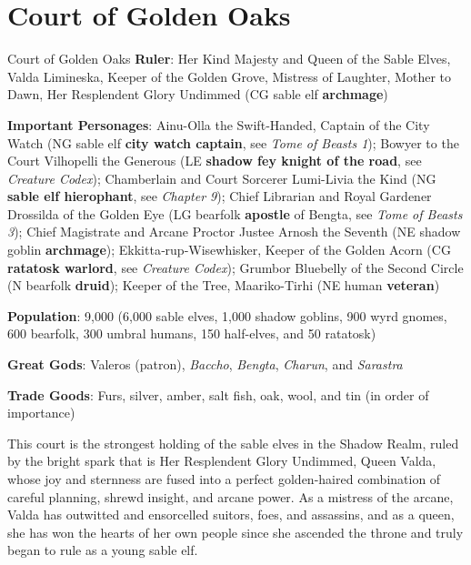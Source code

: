 \documentclass[10pt,a4paper,twoside,bg=print,twocolumn,openany,nodeprecatedcode]{dndbook}
\begin{document}
\section{Court of Golden Oaks}
\begin{DndSidebar}[float=!b]{Court of Golden Oaks}
\textbf{Ruler}: Her Kind Majesty and Queen of the Sable Elves, Valda Limineska, Keeper of the Golden Grove, Mistress of Laughter, Mother to Dawn, Her Resplendent Glory Undimmed (CG sable elf \textbf{archmage})



\textbf{Important Personages}: Ainu-Olla the Swift‑Handed, Captain of the City Watch (NG sable elf \textbf{city watch captain}, see \textit{Tome of Beasts 1}); Bowyer to the Court Vilhopelli the Generous (LE \textbf{shadow fey knight of the road}, see \textit{Creature Codex}); Chamberlain and Court Sorcerer Lumi-Livia the Kind (NG \textbf{sable elf hierophant}, see \textit{Chapter 9}); Chief Librarian and Royal Gardener Drossilda of the Golden Eye (LG bearfolk \textbf{apostle} of Bengta, see \textit{Tome of Beasts 3}); Chief Magistrate and Arcane Proctor Justee Arnosh the Seventh (NE shadow goblin \textbf{archmage}); Ekkitta‑rup‑Wisewhisker, Keeper of the Golden Acorn (CG \textbf{ratatosk warlord}, see \textit{Creature Codex}); Grumbor Bluebelly of the Second Circle (N bearfolk \textbf{druid}); Keeper of the Tree, Maariko-Tirhi (NE human \textbf{veteran})



\textbf{Population}: 9,000 (6,000 sable elves, 1,000 shadow goblins, 900 wyrd gnomes, 600 bearfolk, 300 umbral humans, 150 half-elves, and 50 ratatosk)



\textbf{Great Gods}: Valeros (patron), \textit{Baccho}, \textit{Bengta}, \textit{Charun}, and \textit{Sarastra}



\textbf{Trade Goods}: Furs, silver, amber, salt fish, oak, wool, and tin (in order of importance)





\end{DndSidebar}

This court is the strongest holding of the sable elves in the Shadow Realm, ruled by the bright spark that is Her Resplendent Glory Undimmed, Queen Valda, whose joy and sternness are fused into a perfect golden-haired combination of careful planning, shrewd insight, and arcane power. As a mistress of the arcane, Valda has outwitted and ensorcelled suitors, foes, and assassins, and as a queen, she has won the hearts of her own people since she ascended the throne and truly began to rule as a young sable elf.
\end{document}
